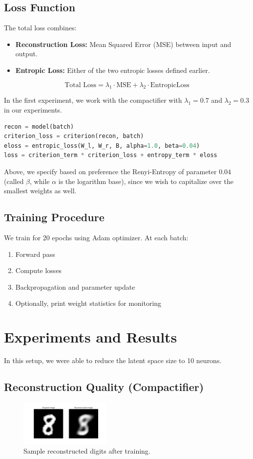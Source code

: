 \documentclass[12pt]{article}
\begin{document}
\subsection{Loss Function}
The total loss combines:
\begin{itemize}
    \item \textbf{Reconstruction Loss:} Mean Squared Error (MSE) between input and output.
    \item \textbf{Entropic Loss:} Either of the two entropic losses defined earlier.
\end{itemize}
\[
\text{Total Loss} = \lambda_1 \cdot \text{MSE} + \lambda_2 \cdot \text{EntropicLoss}
\]

In the first experiment, we work with the compactifier with $\lambda_1 = 0.7$ and $\lambda_2 = 0.3$ in our experiments.

\begin{lstlisting}[language=Python,caption={Loss Computation}]
recon = model(batch)
criterion_loss = criterion(recon, batch)
eloss = entropic_loss(W_l, W_r, B, alpha=1.0, beta=0.04)
loss = criterion_term * criterion_loss + entropy_term * eloss
\end{lstlisting}

Above, we specify based on preference the Renyi-Entropy of parameter \(0.04\) (called \(\beta\), while \(\alpha\) is the logarithm base), since we wish to capitalize over the smallest weights as well.

\subsection{Training Procedure}
We train for 20 epochs using Adam optimizer. At each batch:
\begin{enumerate}
    \item Forward pass
    \item Compute losses
    \item Backpropagation and parameter update
    \item Optionally, print weight statistics for monitoring
\end{enumerate}

\section{Experiments and Results}
In this setup, we were able to reduce the latent space size to 10 neurons. 

\subsection{Reconstruction Quality (Compactifier)}
\begin{figure}[h!]
    \centering
    \includegraphics[width=0.4\textwidth]{recon_example.png}
    \caption{Sample reconstructed digits after training.}
\end{figure}
\end{document}
